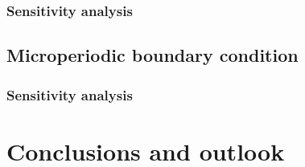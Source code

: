 \documentclass[a4paper,11pt]{article}
\renewcommand{\ts}[1]{\mathbfit{#1}}
\begin{document}
\subsubsection{Sensitivity analysis}

\subsection{Microperiodic boundary condition}
\subsubsection{Sensitivity analysis}



\section{Conclusions and outlook} \label{sec:conclusions}
\end{document}

